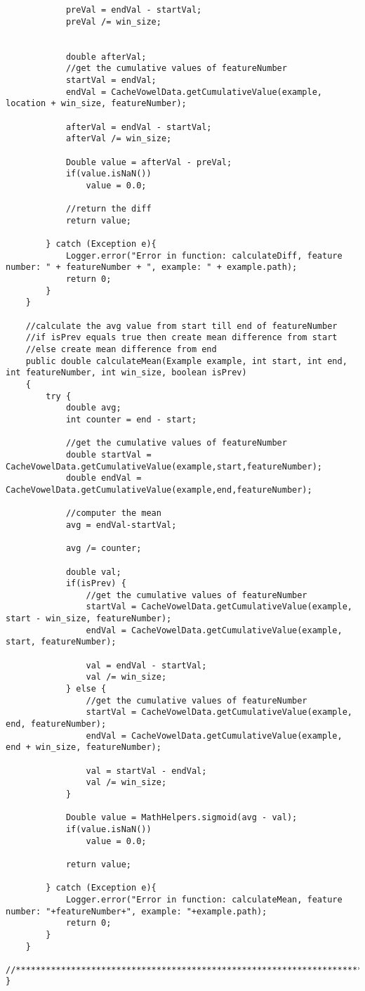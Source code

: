 \documentclass[11pt, oneside]{article}   	%
\begin{document}
\begin{lstlisting}
            preVal = endVal - startVal;
            preVal /= win_size;


            double afterVal;
            //get the cumulative values of featureNumber
            startVal = endVal;
            endVal = CacheVowelData.getCumulativeValue(example, location + win_size, featureNumber);

            afterVal = endVal - startVal;
            afterVal /= win_size;

            Double value = afterVal - preVal;
            if(value.isNaN())
                value = 0.0;

            //return the diff
            return value;

        } catch (Exception e){
            Logger.error("Error in function: calculateDiff, feature number: " + featureNumber + ", example: " + example.path);
            return 0;
        }
    }

    //calculate the avg value from start till end of featureNumber
    //if isPrev equals true then create mean difference from start
    //else create mean difference from end
    public double calculateMean(Example example, int start, int end, int featureNumber, int win_size, boolean isPrev)
    {
        try {
            double avg;
            int counter = end - start;

            //get the cumulative values of featureNumber
            double startVal = CacheVowelData.getCumulativeValue(example,start,featureNumber);
            double endVal = CacheVowelData.getCumulativeValue(example,end,featureNumber);

            //computer the mean
            avg = endVal-startVal;

            avg /= counter;

            double val;
            if(isPrev) {
                //get the cumulative values of featureNumber
                startVal = CacheVowelData.getCumulativeValue(example, start - win_size, featureNumber);
                endVal = CacheVowelData.getCumulativeValue(example, start, featureNumber);

                val = endVal - startVal;
                val /= win_size;
            } else {
                //get the cumulative values of featureNumber
                startVal = CacheVowelData.getCumulativeValue(example, end, featureNumber);
                endVal = CacheVowelData.getCumulativeValue(example, end + win_size, featureNumber);

                val = startVal - endVal;
                val /= win_size;
            }

            Double value = MathHelpers.sigmoid(avg - val);
            if(value.isNaN())
                value = 0.0;

            return value;

        } catch (Exception e){
            Logger.error("Error in function: calculateMean, feature number: "+featureNumber+", example: "+example.path);
            return 0;
        }
    }
    //******************************************************************************************//
}\end{lstlisting}
\end{document}

